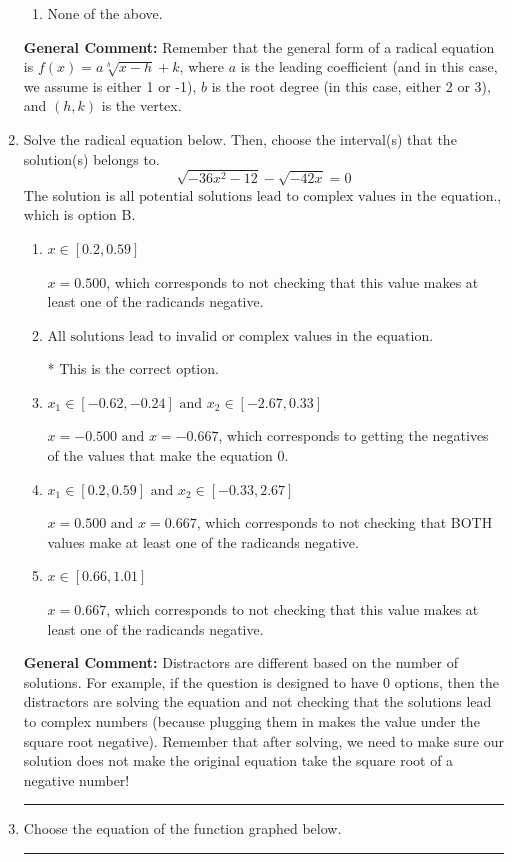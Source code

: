 \documentclass{extbook}[14pt]
\newcommand{\litem}[1]{\item #1

\rule{\textwidth}{0.4pt}}
\begin{document}
\begin{enumerate}
{\begin{enumerate}[label=\Alph*.]
\begin{multicols}{2}
\end{multicols}\item None of the above.\end{enumerate}
\textbf{General Comment:} Remember that the general form of a radical equation is $ f(x) = a \sqrt[b]{x - h} + k $, where $a$ is the leading coefficient (and in this case, we assume is either 1 or -1), $b$ is the root degree (in this case, either 2 or 3), and $(h, k)$ is the vertex.
}
\litem{
Solve the radical equation below. Then, choose the interval(s) that the solution(s) belongs to.
\[ \sqrt{-36 x^2 - 12} - \sqrt{-42 x} = 0 \]The solution is \( \text{all potential solutions lead to complex values in the equation.} \), which is option B.\begin{enumerate}[label=\Alph*.]
\item \( x \in [0.2,0.59] \)

$x = 0.500$, which corresponds to not checking that this value makes at least one of the radicands negative.
\item \( \text{All solutions lead to invalid or complex values in the equation.} \)

* This is the correct option.
\item \( x_1 \in [-0.62, -0.24] \text{ and } x_2 \in [-2.67,0.33] \)

$x = -0.500 \text{ and } x = -0.667$, which corresponds to getting the negatives of the values that make the equation 0.
\item \( x_1 \in [0.2, 0.59] \text{ and } x_2 \in [-0.33,2.67] \)

$x = 0.500 \text{ and } x = 0.667$, which corresponds to not checking that BOTH values make at least one of the radicands negative.
\item \( x \in [0.66,1.01] \)

$x = 0.667$, which corresponds to not checking that this value makes at least one of the radicands negative.
\end{enumerate}

\textbf{General Comment:} Distractors are different based on the number of solutions. For example, if the question is designed to have 0 options, then the distractors are solving the equation and not checking that the solutions lead to complex numbers (because plugging them in makes the value under the square root negative). Remember that after solving, we need to make sure our solution does not make the original equation take the square root of a negative number!
}
\litem{
Choose the equation of the function graphed below.

}
\end{enumerate}
\end{document}
